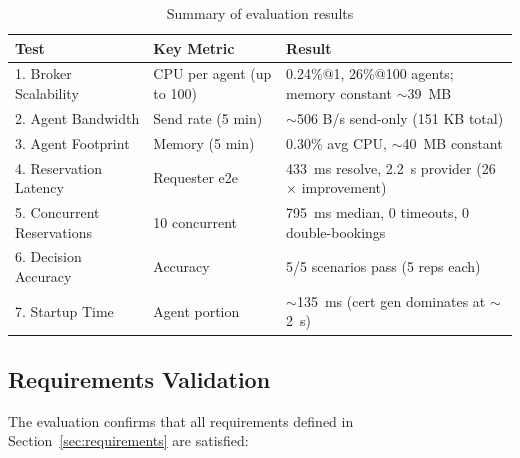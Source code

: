 \begin{table}[htbp]
\centering
\caption{Summary of evaluation results}
\label{tab:summary}
\begin{tabular}{@{}llp{7cm}@{}}
\toprule
\textbf{Test} & \textbf{Key Metric} & \textbf{Result} \\
\midrule
1. Broker Scalability     & CPU per agent (up to 100)  & 0.24\%@1, 26\%@100 agents; memory constant ${\sim}$39~MB \\
2. Agent Bandwidth        & Send rate (5 min) & ${\sim}$506 B/s send-only (151 KB total) \\
3. Agent Footprint        & Memory (5 min)  & 0.30\% avg CPU, ${\sim}$40~MB constant \\
4. Reservation Latency    & Requester e2e   & 433~ms resolve, 2.2~s provider (26$\times$ improvement) \\
5. Concurrent Reservations & 10 concurrent   & 795~ms median, 0 timeouts, 0 double-bookings \\
6. Decision Accuracy      & Accuracy         & 5/5 scenarios pass (5 reps each) \\
7. Startup Time           & Agent portion    & ${\sim}$135~ms (cert gen dominates at ${\sim}$2~s) \\
\bottomrule
\end{tabular}
\end{table}

\subsection{Requirements Validation}

The evaluation confirms that all requirements defined in Section~\ref{sec:requirements} are satisfied:

